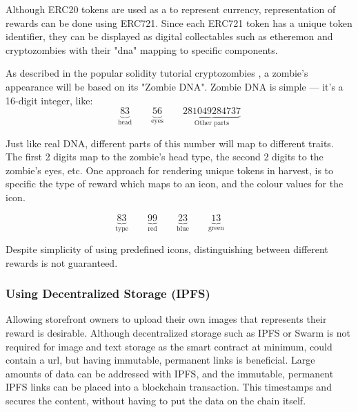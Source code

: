 \documentclass[12pt,tightenlines,letterpaper]{scrartcl}
\begin{document}
Although ERC20 tokens are used as a to represent currency, representation of rewards can be done using ERC721. Since each ERC721 token has a unique token identifier, they can be displayed as digital collectables such as etheremon and cryptozombies \cite{cryptozombies} with their "dna" mapping to specific components.


As described in the popular solidity tutorial cryptozombies \cite{cryptozombies}, a zombie's appearance will be based on its "Zombie DNA". Zombie DNA is simple — it's a 16-digit integer, like:
\[
\underbrace{83}_{\text{head}} \qquad  \underbrace{56}_{\text{eyes}} \qquad \underbrace{281049284737}_{\text{Other parts}}
\]


Just like real DNA, different parts of this number will map to different traits. The first 2 digits map to the zombie's head type, the second 2 digits to the zombie's eyes, etc. One approach for rendering unique tokens in harvest, is to specific the type of reward which maps to an icon, and the colour values for the icon.

\[
\underbrace{83}_{\text{type}} \qquad  \underbrace{99}_{\text{red}} \qquad \underbrace{23}_{\text{blue}} \qquad \underbrace{13}_{\text{green}} \qquad 
\]


Despite simplicity of using predefined icons, distinguishing between different rewards is not guaranteed.

\subsubsection{Using Decentralized Storage (IPFS)}


Allowing storefront owners to upload their own images that represents their reward is desirable. Although decentralized storage such as IPFS or Swarm is not required for image and text storage as the smart contract at minimum, could contain a url, but having immutable, permanent links is beneficial. 
 Large amounts of data can be addressed with IPFS, and the immutable, permanent IPFS links can be placed into a blockchain transaction. This timestamps and secures the content, without having to put the data on the chain itself.
\end{document}
